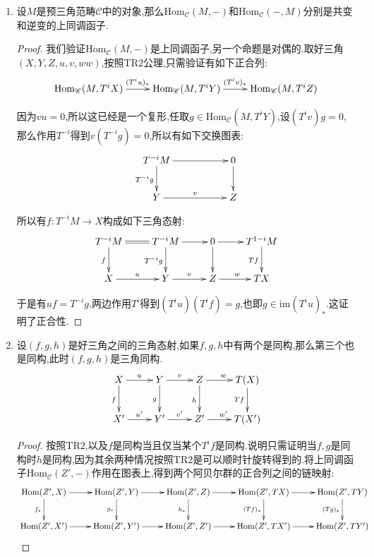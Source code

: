 \begin{enumerate}
\begin{proof}
    	最右侧图表作用$T^{-1}$,就得到有如下交换图表:
    	$$\xymatrix{X\ar[r]^u\ar[d]_f&Y\ar[r]^v\ar[d]_g&Z\ar[r]^w\ar[d]_h&T(X)\ar[d]_{Tf}\\X'\ar[r]^{u'}&Y'\ar[r]^{v'}&Z'\ar[r]^{w'}&T(X')}$$
    \end{proof}
    \item 设$M$是预三角范畴$\mathscr{C}$中的对象,那么$\mathrm{Hom}_{\mathscr{C}}(M,-)$和$\mathrm{Hom}_{\mathscr{C}}(-,M)$分别是共变和逆变的上同调函子.
    \begin{proof}
    	
    	我们验证$\mathrm{Hom}_{\mathscr{C}}(M,-)$是上同调函子,另一个命题是对偶的.取好三角$(X,Y,Z,u,v,ww)$,按照$\mathrm{TR}2$公理,只需验证有如下正合列:
    	$$\xymatrix{\mathrm{Hom}_{\mathscr{C}}(M,T^iX)\ar[r]^{(T^iu)_*}&\mathrm{Hom}_{\mathscr{C}}(M,T^iY)\ar[r]^{(T^iv)_*}&\mathrm{Hom}_{\mathscr{C}}(M,T^iZ)}$$
    	
    	因为$vu=0$,所以这已经是一个复形,任取$g\in\mathrm{Hom}_{\mathscr{C}}(M,T^iY)$,设$(T^iv)g=0$,那么作用$T^{-i}$得到$v(T^{-i}g)=0$,所以有如下交换图表:
    	$$\xymatrix{T^{-i}M\ar[rr]\ar[d]_{T^{-i}g}&&0\ar[d]\\Y\ar[rr]^v&&Z}$$
    	
    	所以有$f:T^{-i}M\to X$构成如下三角态射:
    	$$\xymatrix{T^{-i}M\ar@{=}[r]\ar[d]_{f}&T^{-i}M\ar[r]\ar[d]_{T^{-i}g}&0\ar[d]\ar[r]&T^{1-i}M\ar[d]_{Tf}\\X\ar[r]^u&Y\ar[r]^v&Z\ar[r]^{w}&TX}$$
    	
    	于是有$uf=T^{-i}g$,两边作用$T^i$得到$(T^iu)(T^if)=g$,也即$g\in\mathrm{im}(T^iu)_*$.这证明了正合性.
    \end{proof}
    \item 设$(f,g,h)$是好三角之间的三角态射,如果$f,g,h$中有两个是同构,那么第三个也是同构,此时$(f,g,h)$是三角同构.
    $$\xymatrix{X\ar[r]^u\ar[d]_f&Y\ar[r]^v\ar[d]_g&Z\ar[r]^w\ar[d]_h&T(X)\ar[d]_{Tf}\\X'\ar[r]^{u'}&Y'\ar[r]^{v'}&Z'\ar[r]^{w'}&T(X')}$$
    \begin{proof}
    	
    	按照$\mathrm{TR}2$,以及$f$是同构当且仅当某个$T^if$是同构.说明只需证明当$f,g$是同构时$h$是同构,因为其余两种情况按照$\mathrm{TR}2$是可以顺时针旋转得到的.将上同调函子$\mathrm{Hom}_{\mathscr{C}}(Z',-)$作用在图表上,得到两个阿贝尔群的正合列之间的链映射:
    	$$\xymatrix{\mathrm{Hom}(Z',X)\ar[r]\ar[d]_{f_*}&\mathrm{Hom}(Z',Y)\ar[r]\ar[d]_{g_*}&\mathrm{Hom}(Z',Z)\ar[r]\ar[d]_{h_*}&\mathrm{Hom}(Z',TX)\ar[r]\ar[d]_{(Tf)_*}&\mathrm{Hom}(Z',TY)\ar[d]_{(Tg)_*}\\\mathrm{Hom}(Z',X')\ar[r]&\mathrm{Hom}(Z',Y')\ar[r]&\mathrm{Hom}(Z',Z')\ar[r]&\mathrm{Hom}(Z',TX')\ar[r]&\mathrm{Hom}(Z',TY')}$$
    	

\end{proof}
\end{enumerate}
